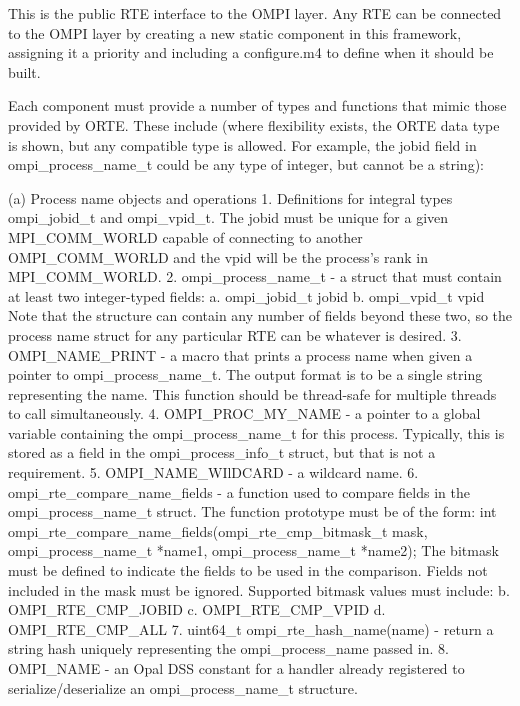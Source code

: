 \iffalse
 This is the public RTE interface to the OMPI layer. Any RTE can be
 connected to the OMPI layer by creating a new static component in
 this framework, assigning it a priority and including a configure.m4
 to define when it should be built.

 Each component must provide a number of types and functions that mimic
 those provided by ORTE. These include (where flexibility exists, the
 ORTE data type is shown, but any compatible type is allowed. For example,
 the jobid field in ompi_process_name_t could be any type of integer, but
 cannot be a string):

 (a) Process name objects and operations
     1. Definitions for integral types ompi_jobid_t and ompi_vpid_t.
        The jobid must be unique for a given MPI_COMM_WORLD capable of
        connecting to another OMPI_COMM_WORLD and the vpid will be the
        process's rank in MPI_COMM_WORLD.
     2. ompi_process_name_t - a struct that must contain at least two integer-typed fields:
           a. ompi_jobid_t jobid
           b. ompi_vpid_t vpid
        Note that the structure can contain any number of fields beyond these
        two, so the process name struct for any particular RTE can be whatever
        is desired.
     3. OMPI_NAME_PRINT - a macro that prints a process name when given
        a pointer to ompi_process_name_t. The output format is to be
        a single string representing the name.  This function should
        be thread-safe for multiple threads to call simultaneously.
     4. OMPI_PROC_MY_NAME - a pointer to a global variable containing
        the ompi_process_name_t for this process. Typically, this is
        stored as a field in the ompi_process_info_t struct, but that
        is not a requirement.
     5. OMPI_NAME_WIlDCARD - a wildcard name.
     6. ompi_rte_compare_name_fields - a function used to compare fields
        in the ompi_process_name_t struct. The function prototype must be
        of the form:
        int ompi_rte_compare_name_fields(ompi_rte_cmp_bitmask_t mask,
                                         ompi_process_name_t *name1,
                                         ompi_process_name_t *name2);
        The bitmask must be defined to indicate the fields to be used
        in the comparison. Fields not included in the mask must be ignored.
        Supported bitmask values must include:
           b. OMPI_RTE_CMP_JOBID
           c. OMPI_RTE_CMP_VPID
           d. OMPI_RTE_CMP_ALL
      7. uint64_t ompi_rte_hash_name(name) - return a string hash uniquely
         representing the ompi_process_name passed in.
      8. OMPI_NAME - an Opal DSS constant for a handler already registered
         to serialize/deserialize an ompi_process_name_t structure.

